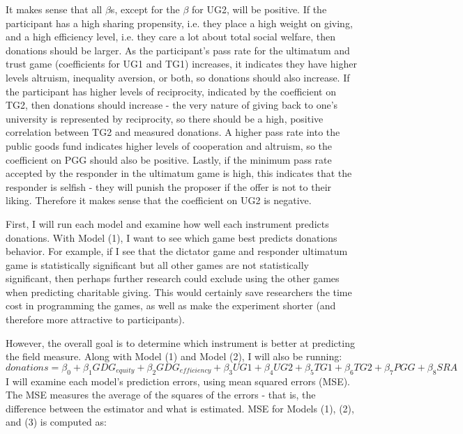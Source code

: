 \documentclass{article}
\begin{document}
{It makes sense that all \(\beta\)s, except for the \(\beta\) for UG2, will be positive. If the participant has a high sharing propensity, i.e. they place a high weight on giving, and a high efficiency level, i.e. they care a lot about total social welfare, then donations should be larger. As the participant\rq s pass rate for the ultimatum and trust game (coefficients for UG1 and TG1) increases, it indicates they have higher levels altruism, inequality aversion, or both, so donations should also increase. If the participant has higher levels of reciprocity, indicated by the coefficient on TG2, then donations should increase - the very nature of giving back to one's university is represented by reciprocity, so there should be a high, positive correlation between TG2 and measured donations. A higher pass rate into the public goods fund indicates higher levels of cooperation and altruism, so the coefficient on PGG should also be positive. Lastly, if the minimum pass rate accepted by the responder in the ultimatum game is high, this indicates that the responder is selfish - they will punish the proposer if the offer is not to their liking. Therefore it makes sense that the coefficient on UG2 is negative. 

First, I will run each model and examine how well each instrument predicts donations. With Model (1), I want to see which game best predicts donations behavior. For example, if I see that the dictator game and responder ultimatum game is statistically significant but all other games are not statistically significant, then perhaps further research could exclude using the other games when predicting charitable giving. This would certainly save researchers the time cost in programming the games, as well as make the experiment shorter (and therefore more attractive to participants). 

However, the overall goal is to determine which instrument is better at predicting the field measure. Along with Model (1) and Model (2), I will also be running:
\begin{equation}
donations=\beta_{0} + \beta_{1} GDG_{equity} + \beta_{2} GDG_{efficiency} + \beta_{3} UG1 + \beta_{4} UG2 + \beta_{5} TG1 + \beta_{6} TG2 + \beta_{7} PGG + \beta_{8}SRA
\end{equation}
I will examine each model's prediction errors, using mean squared errors (MSE). The MSE measures the average of the squares of the errors - that is, the difference between the estimator and what is estimated. MSE for Models (1), (2), and (3) is computed as: \\

}
\end{document}
